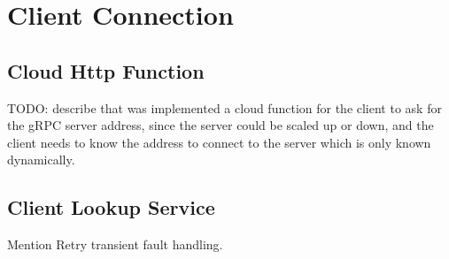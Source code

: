 \chapter{Client Connection}\label{ch:client-connection}

\section{Cloud Http Function}\label{sec:cloud-http-functions}

TODO:
describe that was implemented a cloud function for the client to ask for the gRPC server address,
since the server could be scaled up or down,
and the client needs to know the address to connect to the server which is only known dynamically.

\section{Client Lookup Service}\label{sec:client-lookup-service}

Mention Retry transient fault handling.
